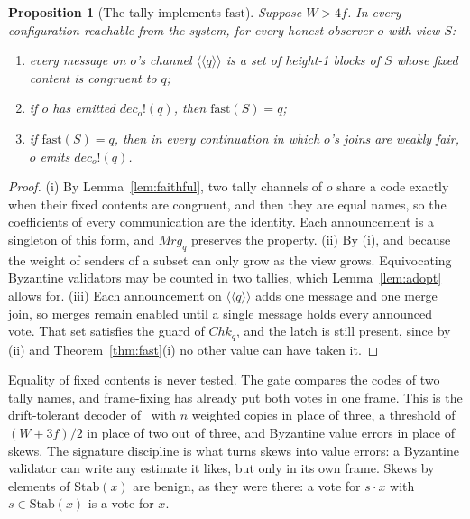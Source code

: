 \documentclass[11pt]{article}
\newtheorem{proposition}[theorem]{Proposition}
\theoremstyle{definition}
\theoremstyle{remark}
\newcommand{\snd}[2]{#1!(#2)}
\newcommand{\act}[2]{#1\cdot #2}
\newcommand{\Stab}{\mathrm{Stab}}
\begin{document}
\begin{proposition}[The tally implements $\mathrm{fast}$]\label{prop:tally}
Suppose $W>4f$. In every configuration reachable from the system, for every
honest observer
$o$ with view $S$:
\begin{enumerate}[label=(\roman*)]
\item every message on $o$'s channel $\langle\!\langle q\rangle\!\rangle$ is
  a set of height-1 blocks of $S$ whose fixed content is congruent to $q$;
\item if $o$ has emitted $\snd{\mathit{dec}_o}{q}$, then
  $\mathrm{fast}(S)=q$;
\item if $\mathrm{fast}(S)=q$, then in every continuation in which $o$'s
  joins are weakly fair, $o$ emits $\snd{\mathit{dec}_o}{q}$.
\end{enumerate}
\end{proposition}

\begin{proof}
(i) By Lemma~\ref{lem:faithful}, two tally channels of $o$ share a code
exactly when their fixed contents are congruent, and then they are equal
names, so the coefficients of every communication are the identity. Each
announcement is a singleton of this form, and $\mathit{Mrg}_q$ preserves the
property. (ii) By (i), and because the weight of senders of a subset can only
grow as the view grows. Equivocating Byzantine validators may be counted in
two tallies, which Lemma~\ref{lem:adopt} allows for. (iii) Each announcement
on $\langle\!\langle q\rangle\!\rangle$ adds one message and one merge join,
so merges remain enabled until a single message holds every announced vote.
That set satisfies the guard of $\mathit{Chk}_q$, and the latch is still
present, since by (ii) and Theorem~\ref{thm:fast}(i) no other value can have
taken it.
\end{proof}

Equality of fixed contents is never tested. The gate compares the codes of
two tally names, and frame-fixing has already put both votes in one frame.
This is the drift-tolerant decoder of~\cite[Theorem 7.3]{oriented} with $n$
weighted copies in place of three, a threshold of $(W+3f)/2$ in place of two
out of three, and Byzantine value errors in place of skews. The signature
discipline is what turns skews into value errors: a Byzantine validator can
write any estimate it likes, but only in its own frame. Skews by elements of
$\Stab(x)$ are benign, as they were there: a vote for $\act{s}{x}$ with
$s\in\Stab(x)$ is a vote for $x$.
\end{document}
